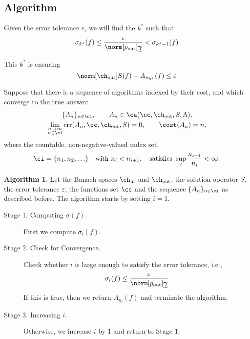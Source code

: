\documentclass[final]{elsarticle}
\newcommand{\chin}{\ch_{\text{\rm{in}}}}
\newcommand{\chout}{\ch_{\text{\rm{out}}}}
\newcommand{\pout}{p_{\text{\rm{out}}}}
\newcommand{\bgamma}{\underline{\boldsymbol\gamma}}
\DeclareMathOperator{\err}{err}
\theoremstyle{definition}
\newtheorem{algo}{Algorithm}
\theoremstyle{remark}
\begin{document}
\subsection{Algorithm}

Given the error tolerance $\varepsilon$, we will find the $k^*$ such that
\begin{equation}
         \sigma_{k^*}(f) \le \frac{\varepsilon}{\norm[\pout]{\bgamma}} < \sigma_{k^*-1}(f)
\end{equation}

This $k^*$ is ensuring
\begin{equation}
\norm[\chout]{S(f)-A_{n_{k^*}}(f)} \le \varepsilon
\end{equation}

Suppose that there is a sequence of algorithms indexed by their cost, and which converge to the true answer:
\begin{subequations} \label{algseqdef}
\begin{gather}
\{A_n\}_{n \in \ci}, \qquad A_n  \in \ca(\cc,\chout,S,\Lambda), \\
\lim_{\substack{n \to \infty\\ n \in \ci}} \err(A_n,\cc,\chout,S) = 0, \qquad \cost(A_n) = n,
\end{gather}
\end{subequations}
where the countable, non-negative-valued index set,
\begin{equation} \label{indexdef}
\ci=\{n_1, n_2, \ldots\} \quad \text{with } n_i < n_{i+1}, \quad \text{satisfies } \sup_i \frac{n_{i+1}}{n_i} <\infty.
\end{equation}

\begin{algo}\label{algo}
Let the Banach spaces $\chin$ and $\chout$, the solution operator $S$, the error tolerance $\varepsilon$, the functions set $\cc$ and the sequence $\{A_n\}_{n \in \ci}$ as described before.
The algorithm starts by setting $i=1$.
\begin{description}
\item[Stage 1. Computing $\sigma(f)$.] First we compute $\sigma_{i}(f)$.
\item[Stage 2. Check for Convergence.] Check whether $i$ is large enough to satisfy the error tolerance, i.e.,
    \begin{equation}
          \sigma_{i}(f) \le \frac{\varepsilon}{\norm[\pout]{\bgamma}}
    \end{equation}
    If this is true, then we return $A_{n_{i}}(f)$ and terminate the algorithm.
\item[Stage 3. Increasing $i$.] Otherwise, we increase $i$ by $1$ and return to Stage $1$.
\end{description}
\end{algo}
\end{document}
